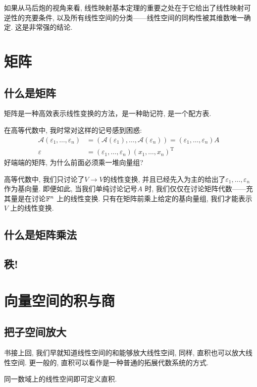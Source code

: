 如果从马后炮的视角来看,
线性映射基本定理的重要之处在于它给出了线性映射可逆性的充要条件,
以及所有线性空间的分类——线性空间的同构性被其维数唯一确定. 这是非常强的结论.

\section{矩阵}
\subsection{什么是矩阵}
矩阵是一种高效表示线性变换的方法，是一种助记符, 是一个配方表.

在高等代数中, 我时常对这样的记号感到困惑:
\begin{align*}
    \mathscr{A}(\varepsilon_{1}, \dots, \varepsilon_{n}) &=
    (\mathscr{A}(\varepsilon_{1}), \dots,
    \mathscr{A}(\varepsilon_{n})) = (\varepsilon_{1},
    \dots, \varepsilon_{n})A\\
    \varepsilon &= (\varepsilon_{1}, \dots, \varepsilon_{n})
    (x_{1}, \dots,   x_{n})^{\mathrm{T}}
\end{align*}
好端端的矩阵, 为什么前面必须乘一堆向量组?

高等代数中, 我们只讨论了\(V \to V\)的线性变换,
并且已经先入为主的给出了\(\varepsilon_{1}, \dots, \varepsilon_{n}\) 作为基向量.
即便如此, 当我们单纯讨论记号\(A\) 时,
我们仅仅在讨论矩阵代数——充其量是在讨论\(\mathbb{F}^{n}\) 上的线性变换.
只有在矩阵前乘上给定的基向量组, 我们才能表示\(V\) 上的线性变换.

\subsection{什么是矩阵乘法}
\subsection{秩!}
\section{向量空间的积与商}
\subsection{把子空间放大}
书接上回, 我们早就知道线性空间的和能够放大线性空间, 同样, 直积也可以放大线性空间.
更一般的, 直积可以看作是一种普通的拓展代数系统的方式.

同一数域上的线性空间即可定义直积.

